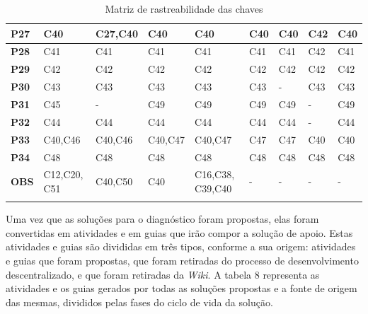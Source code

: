 \begin{longtable}{|M{1.0cm}|M{1.5cm}|M{1.5cm}|M{1.5cm}|M{1.5cm}|M{1.5cm}|M{1.5cm}|M{1.5cm}|M{1.5cm}|}
\textbf{P27} & C40            & C27,C40        & C40            & C40             & C40            & C40            & C42            & C40            \\ \hline
\textbf{P28} & C41            & C41            & C41            & C41             & C41            & C41            & C42            & C41            \\ \hline
\textbf{P29} & C42            & C42            & C42            & C42             & C42            & C42            & C42            & C42            \\ \hline
\textbf{P30} & C43            & C43            & C43            & C43             & C43            & -              & C43            & C43            \\ \hline
\textbf{P31} & C45            & -              & C49            & C49             & C49            & C49            & -              & C49            \\ \hline
\textbf{P32} & C44            & C44            & C44            & C44             & C44            & C44            & -              & C44            \\ \hline
\textbf{P33} & C40,C46        & C40,C46        & C40,C47        & C40,C47         & C47            & C47            & C40            & C40            \\ \hline
\textbf{P34} & C48            & C48            & C48            & C48             & C48            & C48            & C48            & C48            \\ \hline
\textbf{OBS} & C12,C20, C51    & C40,C50        & C40            & C16,C38, C39,C40 & -              & -              & -              & -              \\ \hline
\caption{Matriz de rastreabilidade das chaves}
\end{longtable}

Uma vez que as soluções para o diagnóstico foram propostas, elas foram convertidas em atividades e em guias que irão compor a solução de apoio. Estas atividades e guias são divididas em três tipos, conforme a sua origem: atividades e guias que foram propostas, que foram retiradas do processo de desenvolvimento descentralizado, e que foram retiradas da \textit{Wiki}.  A tabela 8 representa as atividades e os guias gerados por todas as soluções propostas e a fonte de origem das mesmas, divididos pelas fases do ciclo de vida da solução.\clearpage


